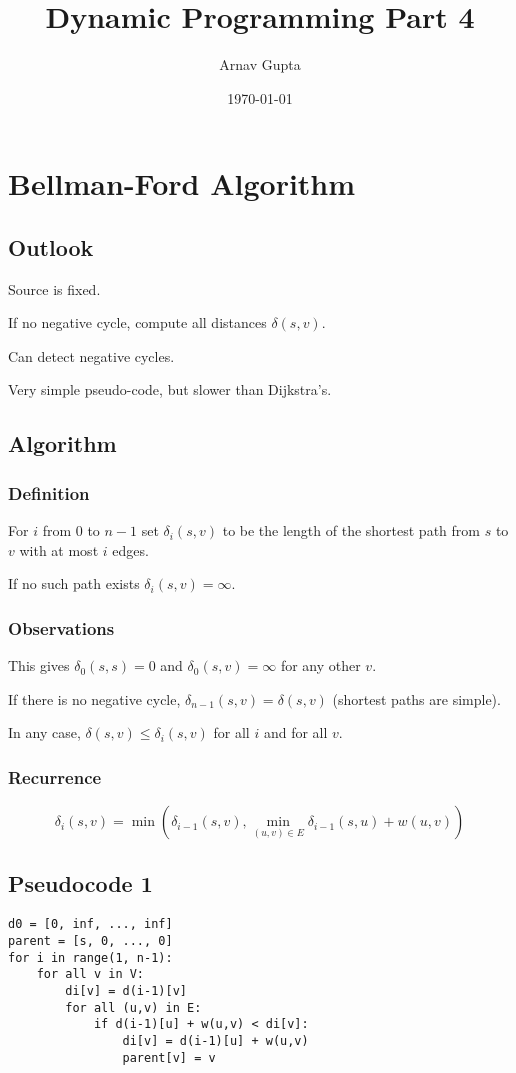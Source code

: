 \documentclass[11pt]{article}
\author{Arnav Gupta}
\date{\today}
\title{Dynamic Programming Part 4}
\begin{document}
\maketitle
\tableofcontents

\section{Bellman-Ford Algorithm}
\label{sec:org3da980e}
\subsection{Outlook}
\label{sec:org6217f2f}
Source is fixed.

If no negative cycle, compute all distances \(\delta(s, v)\).

Can detect negative cycles.

Very simple pseudo-code, but slower than Dijkstra's.
\subsection{Algorithm}
\label{sec:orgf24d29d}
\subsubsection{Definition}
\label{sec:orga492952}
For \(i\) from 0 to \(n-1\) set
\(\delta_{i}(s, v)\) to be the length of the shortest path from \(s\) to \(v\) with at most
\(i\) edges.

If no such path exists \(\delta_{i}(s, v) = \infty\).
\subsubsection{Observations}
\label{sec:org75c3122}
This gives \(\delta_{0}(s, s) = 0\) and \(\delta_{0}(s, v) = \infty\) for any other \(v\).

If there is no negative cycle, \(\delta_{n-1}(s, v) = \delta(s, v)\) (shortest paths
are simple).

In any case, \(\delta(s, v) \le \delta_{i}(s, v)\) for all \(i\) and for all \(v\).
\subsubsection{Recurrence}
\label{sec:org9f95e23}
$$
\delta_{i}(s, v) = \min(\delta_{i-1}(s,v), \min_{(u, v) \in E} \delta_{i-1} (s, u) + w(u, v))
$$
\subsection{Pseudocode 1}
\label{sec:orge66aab4}
\begin{verbatim}
d0 = [0, inf, ..., inf]
parent = [s, 0, ..., 0]
for i in range(1, n-1):
    for all v in V:
        di[v] = d(i-1)[v]
        for all (u,v) in E:
            if d(i-1)[u] + w(u,v) < di[v]:
                di[v] = d(i-1)[u] + w(u,v)
                parent[v] = v
\end{verbatim}
\end{document}
